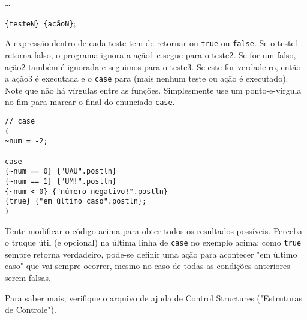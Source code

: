 \dots

\texttt{\{testeN\} \{açãoN\}};

A expressão dentro de cada teste tem de retornar ou \texttt{true} ou \texttt{false}. Se o teste1 retorna falso, o programa ignora a ação1 e segue para o teste2. Se for um falso, ação2 também é ignorada e seguimos para o teste3. Se este for verdadeiro, então a ação3 é executada e o \texttt{case} para (mais nenhum teste ou ação é executado). Note que não há vírgulas entre as funções. Simplesmente use um ponto-e-vírgula no fim para marcar o final do enunciado \texttt{case}.

 
\begin{lstlisting}[style=SuperCollider-IDE, basicstyle=\scttfamily\footnotesize]
// case
(
~num = -2;

case
{~num == 0} {"UAU".postln}
{~num == 1} {"UM!".postln}
{~num < 0} {"número negativo!".postln}
{true} {"em último caso".postln};
)
\end{lstlisting}
 
Tente modificar o código acima para obter todos os resultados possíveis. Perceba o truque útil (e opcional) na última linha de \texttt{case} no exemplo acima: como \texttt{true} sempre retorna verdadeiro, pode-se definir uma ação para acontecer "em último caso" que vai sempre ocorrer, mesmo no caso de todas as condições anteriores serem falsas.

Para saber mais, verifique o arquivo de ajuda de Control Structures ("Estruturas de Controle").
